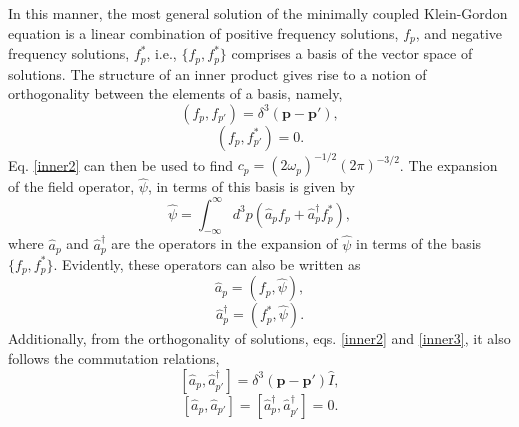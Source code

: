 \documentclass[
12pt,		%
openright,	%
twoside,  %
a4paper,			%
chapter=TITLE,		%
english,			%
french,				%
spanish,			%
brazil				%
]{USPSC-classe/USPSC}
\begin{document}
In this manner, the most general solution of the minimally coupled Klein-Gordon equation is a linear combination of positive frequency solutions, $f_p$, and negative frequency solutions, $f_p^*$, i.e., $\{f_p,f_p^*\}$ comprises a basis of the vector space of solutions. The structure of an inner product gives rise to a notion of orthogonality between the elements of a basis, namely,
\begin{equation}\label{inner2}
    (f_p,f_{p'})=\delta^3(\textbf{p}-\textbf{p}'),
\end{equation}
\begin{equation}\label{inner3}
    (f_p,f_{p'}^*)=0.
\end{equation}
Eq. \ref{inner2} can then be used to find $c_p=(2\omega_p)^{-1/2}(2\pi)^{-3/2}$. The expansion of the field operator, $\hat{\psi}$, in terms of this basis is given by
\begin{equation}\label{exp1234}
    \hat{\psi}=\int^{\infty}_{-\infty} d^3p\left(\hat{a}_pf_p+\hat{a}^{\dag}_pf_p^*\right),
\end{equation}
where $\hat{a}_p$ and $\hat{a}_p^{\dag}$ are the operators in the expansion of $\hat{\psi}$ in terms of the basis $\{f_p,f_p^*\}$. Evidently, these operators can also be written as
\begin{equation}
    \hat{a}_p=(f_p,\hat{\psi}),
\end{equation}
\begin{equation}
    \hat{a}^{\dag}_p=(f^*_{p},\hat{\psi}).
\end{equation}
Additionally, from the orthogonality of solutions, eqs. \ref{inner2} and \ref{inner3}, it also follows the commutation relations,
\begin{equation}\label{commua}
    [\hat{a}_p,\hat{a}^{\dag}_{p'}]=\delta^3(\textbf{p}-\textbf{p}')\hat{I},
 \end{equation}
\begin{equation}\label{commua1}
    \left[\hat{a}_p,\hat{a}_{p'}\right]=[\hat{a}^{\dag}_p,\hat{a}^{\dag}_{p'}]=0.
\end{equation}
\end{document}
